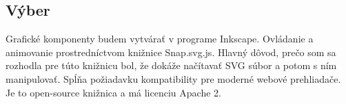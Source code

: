 \subsection{Výber}
Grafické komponenty budem vytvárať v programe Inkscape. Ovládanie a animovanie prostredníctvom knižnice Snap.svg.js. Hlavný dôvod, prečo som sa rozhodla pre túto knižnicu bol, že dokáže načítavať SVG súbor a potom s ním manipulovať.
Spĺňa požiadavku kompatibility pre moderné webové prehliadače. Je to open-source knižnica a má licenciu Apache 2.  